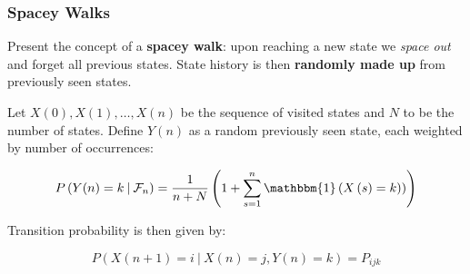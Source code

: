 \documentclass{beamer}
\begin{document}
\begin{frame}
\frametitle{Spacey Walks}

Present the concept of a \textbf{spacey walk}: upon reaching a new state we \textit{space out} and forget all previous states.  State history is then \textbf{randomly made up} from previously seen states.

\begin{block}{}

Let $X\left(0\right), X\left(1\right), \ldots, X\left(n\right)$ be the sequence of visited states and $N$ to be the number of states.  Define $Y\left(n\right)$ as a random previously seen state, each weighted by number of occurrences:

\begin{equation*}
P\left(Y(n) = k \:|\: \mathcal{F}_n \right) = \frac{1}{n+N}\left(1 + \sum_{s=1}^n \mathbbm{1}\left(X\left(s) = k\right) \right) \right)
\end{equation*}

Transition probability is then given by:

\begin{equation*}
P\left(X\left(n+1\right) = i \:|\: X(n) = j, Y(n) = k\right) = P_{ijk}
\end{equation*}

\end{block}

\end{frame}
\end{document}
